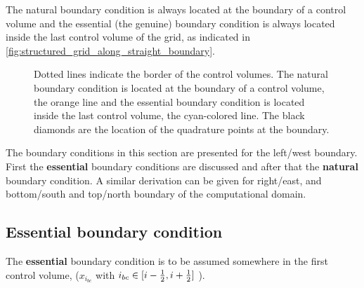 The natural boundary condition is always located at the boundary of a control volume and the essential (the genuine) boundary condition is always located inside the last control volume of the grid, as indicated in \autoref{fig:structured_grid_along_straight_boundary}.
\begin{figure}[H]
    \begin{center}
    \def\svgwidth{0.8\textwidth} %
    \resizebox{0.65\textwidth}{!}{
        
    }
\end{center}
    \caption[Definition of the grid to solve the 2D-shallow water equations at the boundary]{Dotted lines indicate the border of the control volumes. The natural boundary condition is located at the boundary of a control volume, the orange line and the essential boundary condition is located inside the last control volume, the cyan-colored line.
    The black diamonds are the location of the quadrature points at the boundary.}
    \label{fig:structured_grid_along_straight_boundary}
\end{figure}

The boundary conditions in this section are presented for the left/west boundary.
First the \textbf{essential} boundary conditions are discussed and after that the \textbf{natural} boundary condition.
A similar derivation can be given for right/east, and bottom/south and top/north boundary of the computational domain.


\subsection{Essential boundary condition}

The \textbf{essential} boundary condition is to be assumed somewhere in the first control volume, ($x_{i_{bc}}$ with $i_{bc} \in [i-\frac{1}{2}, i+\frac{1}{2}]$ ).

